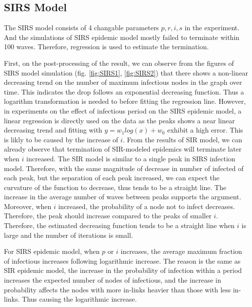 \documentclass{subfile}
\begin{document}
  \subsection{SIRS Model}
  The SIRS model consists of 4 changable parameters \(p, r, i, s\) in the experiment. And the simulations of SIRS epidemic model mostly failed to terminate within 100 waves. Therefore, regression is used to estimate the termination.

  First, on the post-processing of the result, we can observe from the figures of SIRS model simulation (fig. \ref{fig:SIRS1}, \ref{fig:SIRS2}) that there shows a non-linear decreasing trend on the number of maximum infectious nodes in the graph over time. This indicates the drop follows an exponential decreasing function. Thus a logarithm transformation is needed to before fitting the regression line. However, in experiments on the effect of infectious period on the SIRS epidemic model, a linear regression is directly used on the data as the peaks shows a near linear decreasing trend and fitting with \(y = w_1 log(x) + w_0\) exhibit a high error. This is likly to be caused by the increase of \(i\). From the results of SIR model, we can already observe that termination of SIR-modeled epidemics will terminate later when \(i\) increased. The SIR model is similar to a single peak in SIRS infection model. Therefore, with the same magnitude of decrease in number of infected of each peak, but the separation of each peak increased, we can expect the curvature of the function to decrease, thus tends to be a straight line. The increase in the average number of waves between peaks supports the argument. Moreover, when \(i\) increased, the probability of a node not to infect decreases. Therefore, the peak should increase compared to the peaks of smaller \(i\). Therefore, the estimated decreasing function tends to be a straight line when \(i\) is large and the number of iterations is small.

  For SIRS epidemic model, when \(p\) or \(i\) increases, the average maximum fraction of infectious increases following logarithmic increase. The reason is the same as SIR epidemic model, the increase in the probability of infection within a period increases the expected number of nodes of infectious, and the increase in probability affects the nodes with more in-links heavier than those with less in-links. Thus causing the logarithmic increase.
\end{document}
